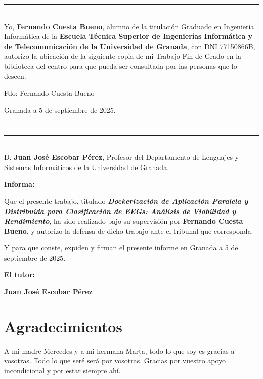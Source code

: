 \noindent\rule[-1ex]{\textwidth}{2pt}\\[4.5ex]

Yo, \textbf{Fernando Cuesta Bueno}, alumno de la titulación Graduado en Ingeniería Informática de la \textbf{Escuela Técnica Superior
       de Ingenierías Informática y de Telecomunicación de la Universidad de Granada}, con DNI 77150866B, autorizo la
ubicación de la siguiente copia de mi Trabajo Fin de Grado en la biblioteca del centro para que pueda ser
consultada por las personas que lo deseen.

\vspace{6cm}

\noindent Fdo: Fernando Cuesta Bueno

\vspace{2cm}

\begin{flushright}
       Granada a 5 de septiembre de 2025.
\end{flushright}


\chapter*{}
\thispagestyle{empty}

\noindent\rule[-1ex]{\textwidth}{2pt}\\[4.5ex]

D. \textbf{Juan José Escobar Pérez}, Profesor del Departamento de Lenguajes y Sistemas Informáticos de la Universidad de Granada.

\vspace{0.5cm}

\textbf{Informa:}

\vspace{0.5cm}

Que el presente trabajo, titulado \textit{\textbf{Dockerización de Aplicación Paralela y Distribuida para Clasificación de EEGs: Análisis de Viabilidad y Rendimiento}},
ha sido realizado bajo su supervisión por \textbf{Fernando Cuesta Bueno}, y autorizo la defensa de dicho trabajo ante el tribunal
que corresponda.

\vspace{0.5cm}

Y para que conste, expiden y firman el presente informe en Granada a 5 de septiembre de 2025.

\vspace{1cm}

\textbf{El tutor:}

\vspace{5cm}

\noindent \textbf{Juan José Escobar Pérez}

\chapter*{Agradecimientos}
\thispagestyle{empty}

\vspace{1cm}


A mi madre Mercedes y a mi hermana Marta, todo lo que soy es gracias a vosotras. Todo lo que seré será por vosotras. Gracias por vuestro apoyo incondicional y por estar siempre ahí.


